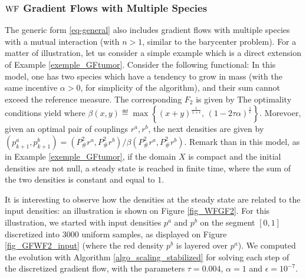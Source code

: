 \subsubsection[WF Gradient Flows with Multiple Species]{$\operatorname{WF}$ Gradient Flows with Multiple Species}
The generic form \eqref{eq-general} also includes gradient flows with multiple species with a mutual interaction (with $n>1$, similar to the barycenter problem).
For a matter of illustration, let us consider a simple example which is a direct extension of Example \ref{exemple_GFtumor}. Consider the following functional:
In this model, one has two species which have a tendency to grow in mass (with the same incentive $\alpha>0$, for simplicity of the algorithm), and their sum cannot exceed the reference measure. The corresponding $F_2$ is given by 
%
The optimality conditions yield  
where $\beta(x,y)\eqdef\max \left\{ (x+y)^{\frac1{1+\epsilon}}, \, (1-2\tau\alpha)^{\frac1\epsilon} \right\}$. Morevoer, given an optimal pair of couplings $r^a, r^b$, the next densities are given by $(p^a_{k+1},p^b_{k+1}) = (P^2_\# r^a, P^2_\# r^b)/\beta(P^2_\# r^a, P^2_\# r^b)$.
%
Remark than in this model, as in Example \ref{exemple_GFtumor}, if the domain $X$ is compact and the initial densities are not null, a steady state is reached in finite time, where the sum of the two densities is constant and equal to $1$.

It is interesting to observe how the densities at the steady state are related to the input densities: an illustration is shown on Figure \ref{fig_WFGF2}. For this illustration, we started with input densities $p^a$ and $p^b$ on the segment $[0,1]$ discretized into $3000$ uniform samples, as displayed on Figure \ref{fig_GFWF2_input} (where the red density $p^b$ is layered over $p^a$). We computed the evolution with Algorithm \ref{algo_scaling_stabilized} for solving each step of the discretized gradient flow, with the parameters $\tau=0.004$, $\alpha=1$ and $\epsilon=10^{-7}$.

